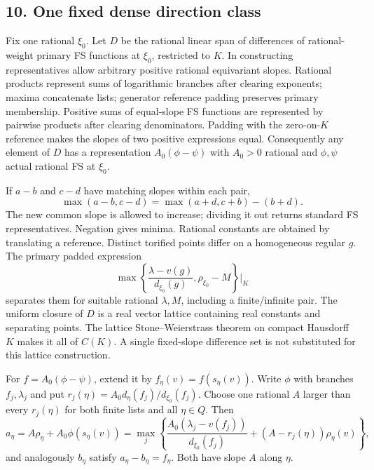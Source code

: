 \documentclass[
  11pt,
]{article}
\begin{document}
\subsection{10. One fixed dense direction
class}\label{one-fixed-dense-direction-class}

Fix one rational \(\xi_0\). Let \(D\) be the rational linear span of
differences of rational-weight primary FS functions at \(\xi_0\),
restricted to \(K\). In constructing representatives allow arbitrary
positive rational equivariant slopes. Rational products represent sums
of logarithmic branches after clearing exponents; maxima concatenate
lists; generator reference padding preserves primary membership.
Positive sums of equal-slope FS functions are represented by pairwise
products after clearing denominators. Padding with the zero-on-\(K\)
reference makes the slopes of two positive expressions equal.
Consequently any element of \(D\) has a representation
\(A_0(\phi-\psi)\) with \(A_0>0\) rational and \(\phi,\psi\) actual
rational FS at \(\xi_0\).

If \(a-b\) and \(c-d\) have matching slopes within each pair,
\[ \max(a-b,c-d)=\max(a+d,c+b)-(b+d).\] The new common slope is allowed
to increase; dividing it out returns standard FS representatives.
Negation gives minima. Rational constants are obtained by translating a
reference. Distinct torified points differ on a homogeneous regular
\(g\). The primary padded expression
\[ \max\left\{\frac{\lambda-v(g)}{d_{\xi_0}(g)},\rho_{\xi_0}-M\right\}\bigg|_K\]
separates them for suitable rational \(\lambda,M\), including a
finite/infinite pair. The uniform closure of \(D\) is a real vector
lattice containing real constants and separating points. The lattice
Stone--Weierstrass theorem on compact Hausdorff \(K\) makes it all of
\(C(K)\). A single fixed-slope difference set is not substituted for
this lattice construction.

For \(f=A_0(\phi-\psi)\), extend it by \(f_\eta(v)=f(s_\eta(v))\). Write
\(\phi\) with branches \(f_j,\lambda_j\) and put
\(r_j(\eta)=A_0d_\eta(f_j)/d_{\xi_0}(f_j)\). Choose one rational \(A\)
larger than every \(r_j(\eta)\) for both finite lists and all
\(\eta\in Q\). Then \[ a_\eta=A\rho_\eta+A_0\phi(s_\eta(v))
   =\max_j\left\{\frac{A_0(\lambda_j-v(f_j))}{d_{\xi_0}(f_j)}
                      +(A-r_j(\eta))\rho_\eta(v)\right\},               \tag{25}\]
and analogously \(b_\eta\) satisfy \(a_\eta-b_\eta=f_\eta\). Both have
slope \(A\) along \(\eta\).
\end{document}
